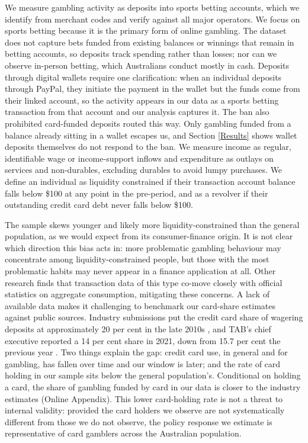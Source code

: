 \documentclass[11pt]{article}
\begin{document}
We measure gambling activity as deposits into sports betting accounts, which we identify from merchant codes and verify against all major operators. We focus on sports betting because it is the primary form of online gambling. The dataset does not capture bets funded from existing balances or winnings that remain in betting accounts, so deposits track spending rather than losses; nor can we observe in-person betting, which Australians conduct mostly in cash. Deposits through digital wallets require one clarification: when an individual deposits through PayPal, they initiate the payment in the wallet but the funds come from their linked account, so the activity appears in our data as a sports betting transaction from that account and our analysis captures it. The ban also prohibited card-funded deposits routed this way. Only gambling funded from a balance already sitting in a wallet escapes us, and Section \ref{Results} shows wallet deposits themselves do not respond to the ban. We measure income as regular, identifiable wage or income-support inflows and expenditure as outlays on services and non-durables, excluding durables to avoid lumpy purchases. We define an individual as liquidity constrained if their transaction account balance falls below \$100 at any point in the pre-period, and as a revolver if their outstanding credit card debt never falls below \$100.

The sample skews younger and likely more liquidity-constrained than the general population, as we would expect from its consumer-finance origin. It is not clear which direction this bias acts in: more problematic gambling behaviour may concentrate among liquidity-constrained people, but those with the most problematic habits may never appear in a finance application at all. Other research finds that transaction data of this type co-move closely with official statistics on aggregate consumption, mitigating these concerns. A lack of available data makes it challenging to benchmark our card-share estimates against public sources. Industry submissions put the credit card share of wagering deposits at approximately 20 per cent in the late 2010s \citep{AustralianBankingAssociation2020UseCreditCardsGambling}, and TAB's chief executive reported a 14 per cent share in 2021, down from 15.7 per cent the previous year . Two things explain the gap: credit card use, in general and for gambling, has fallen over time and our window is later; and the rate of card holding in our sample sits below the general population's. Conditional on holding a card, the share of gambling funded by card in our data is closer to the industry estimates (Online Appendix). This lower card-holding rate is not a threat to internal validity: provided the card holders we observe are not systematically different from those we do not observe, the policy response we estimate is representative of card gamblers across the Australian population.
\end{document}

